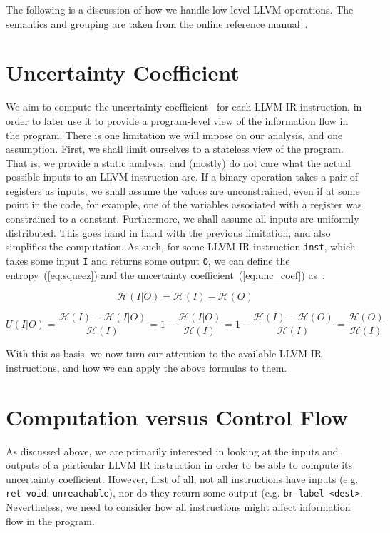 \documentclass[a4paper]{article}
\newcommand{\entropy}[1]{\mathcal{H}(#1)}
\begin{document}
The following is a discussion of how we handle low-level LLVM operations. The
semantics and grouping are taken from the online reference
manual~\cite{llvm-ref}.

\section*{Uncertainty Coefficient}
We aim to compute the uncertainty coefficient~\cite{press2007numerical} for
each LLVM IR instruction, in order to later use it to provide a program-level
view of the information flow in the program. There is one limitation we will
impose on our analysis, and one assumption. First, we shall limit ourselves to
a stateless view of the program. That is, we provide a static analysis, and
(mostly) do not care what the actual possible inputs to an LLVM instruction
are. If a binary operation takes a pair of registers as inputs, we shall assume
the values are unconstrained, even if at some point in the code, for example,
one of the variables associated with a register was constrained to a constant.
Furthermore, we shall assume all inputs are uniformly distributed. This goes
hand in hand with the previous limitation, and also simplifies the computation.
As such, for some LLVM IR instruction \texttt{inst}, which takes some input
\texttt{I} and returns some output \texttt{O}, we can define the
entropy~(\autoref{eq:squeez}) and the uncertainty
coefficient~(\autoref{eq:unc_coef}) as~\cite{clark2012squeeziness}:

\begin{equation}\label{eq:squeez}
    \entropy{I|O} = \entropy{I} - \entropy{O}
\end{equation}

\begin{equation}\label{eq:unc_coef}
    U(I|O) = \frac{\entropy{I} - \entropy{I|O}}{\entropy{I}} = 1 -
    \frac{\entropy{I|O}}{\entropy{I}} = 1 - \frac{\entropy{I} -
    \entropy{O}}{\entropy{I}} = \frac{\entropy{O}}{\entropy{I}}
\end{equation}

With this as basis, we now turn our attention to the available LLVM IR
instructions, and how we can apply the above formulas to them.

\section*{Computation versus Control Flow}
As discussed above, we are primarily interested in looking at the inputs and
outputs of a particular LLVM IR instruction in order to be able to compute its
uncertainty coefficient. However, first of all, not all instructions have
inputs (e.g. \texttt{ret void}, \texttt{unreachable}), nor do they return some
output (e.g. \texttt{br label <dest>}. Nevertheless, we need to consider how
all instructions might affect information flow in the program.
\end{document}
